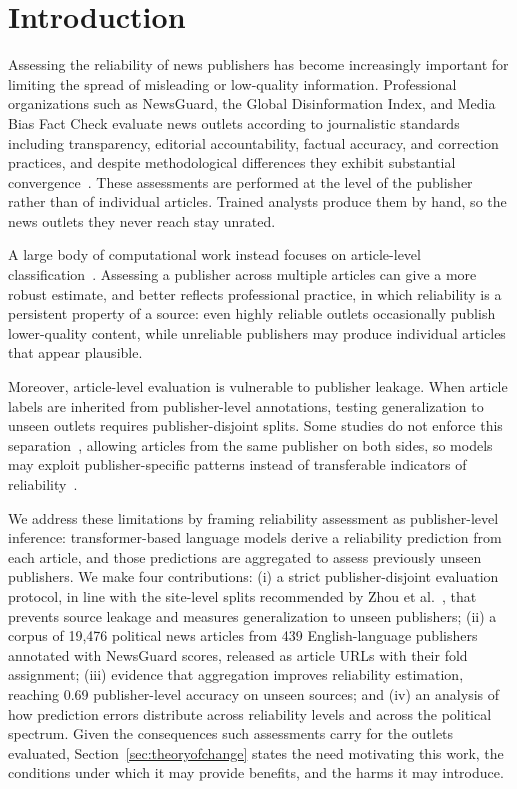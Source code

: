 \documentclass[runningheads]{llncs}
\begin{document}
\section{Introduction}
Assessing the reliability of news publishers has become increasingly important for limiting the spread of misleading or low-quality information. Professional organizations such as NewsGuard, the Global Disinformation Index, and Media Bias Fact Check evaluate news outlets according to journalistic standards including transparency, editorial accountability, factual accuracy, and correction practices, and despite methodological differences they exhibit substantial convergence~\cite{lin2023high,DBLP:conf/icwsm/PratelliP22}. These assessments are performed at the level of the publisher rather than of individual articles. Trained analysts produce them by hand, so the news outlets they never reach stay unrated.

A large body of computational work instead focuses on article-level classification~\cite{pandolfi2020automatic,Przybyla2021plugin,10.1145/3770077,DBLP:journals/dbsk/AdjiLS26}. Assessing a publisher across multiple articles can give a more robust estimate, and better reflects professional practice, in which reliability is a persistent property of a source: even highly reliable outlets occasionally publish lower-quality content, while unreliable publishers may produce individual articles that appear plausible.

Moreover, article-level evaluation is vulnerable to publisher leakage. When article labels are inherited from publisher-level annotations, testing generalization to unseen outlets requires publisher-disjoint splits. Some studies do not enforce this separation~\cite{burdisso-etal-2024-reliability,DBLP:journals/dbsk/AdjiLS26,batDataset}, allowing articles from the same publisher on both sides, so models may exploit publisher-specific patterns instead of transferable indicators of reliability~\cite{azizov-etal-2024-safari,verhoeven2025yesterday,zhou-etal-2021-hidden}.

We address these limitations by framing reliability assessment as publisher-level inference: transformer-based language models derive a reliability prediction from each article, and those predictions are aggregated to assess previously unseen publishers. We make four contributions: (i) a strict publisher-disjoint evaluation protocol, in line with the site-level splits recommended by Zhou et al.~\cite{zhou-etal-2021-hidden}, that prevents source leakage and measures generalization to unseen publishers; (ii) a corpus of 19,476 political news articles from 439 English-language publishers annotated with NewsGuard scores, released as article URLs with their fold assignment; (iii) evidence that aggregation improves reliability estimation, reaching 0.69 publisher-level accuracy on unseen sources; and (iv) an analysis of how prediction errors distribute across reliability levels and across the political spectrum. Given the consequences such assessments carry for the outlets evaluated, Section~\ref{sec:theoryofchange} states the need motivating this work, the conditions under which it may provide benefits, and the harms it may introduce.
\end{document}
